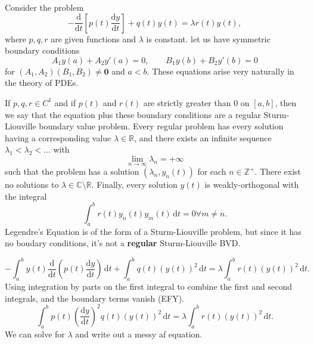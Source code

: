 Consider the problem
\[
	-\frac{\mathrm{d}}{\mathrm{d}t} \left[ p(t)\frac{\mathrm{d}y}{\mathrm{d}t}  \right] +q(t)y(t)=\lambda r(t)y(t)
,\]
where $p,q,r$ are given functions and $\lambda $ is constant. let us have symmetric boundary conditions
\[
	A_1y(a)+A_2y'(a)=0,\qquad B_1y(b)+B_2y'(b)=0
\]
for $(A_1,A_2)(B_1,B_2)\neq \mathbf{0} $ and $a<b$. These equations arise very naturally in the theory of PDEs.

If $p,q,r\in C^1$ and if $p(t)$ and $r(t)$ are strictly greater than $0$ on $[a,b]$, then we say that the equation plus these boundary conditions are a regular Sturm-Liouville boundary value problem. Every regular problem has every solution having a corresponding value $\lambda \in\mathbb{R}$, and there exists an infinite sequence $\lambda_1 <\lambda_2<\ldots$ with
\[
	\lim_{n \to \infty} \lambda_n=+\infty
\]
such that the problem has a solution  $\left( \lambda _n,y_n(t) \right) $ for each $n\in\mathbb{Z}^+$. There exist no solutions to $\lambda \in\mathbb{C}\setminus\mathbb{R}$. Finally, every solution $y(t)$ is weakly-orthogonal with the integral
\[
	\int_{a}^{b} r(t)y_n(t)y_m(t) \,\mathrm{d} t=0\forall m\neq n
.\]
Legendre's Equation is of the form of a Sturm-Liouville problem, but since it has no boudary conditions, it's not a \textbf{regular} Sturm-Liouville BVD.

\[
	-\int_{a}^{b} y(t)\frac{\mathrm{d}}{\mathrm{d}t} \left( p(t)\frac{\mathrm{d}y}{\mathrm{d}t}  \right)  \,\mathrm{d} t+\int_{a}^{b} q(t)\left( y(t) \right) ^2 \,\mathrm{d} t=\lambda \int_{a}^{b} r(t)(y(t))^2 \,\mathrm{d} t
.\]
Using integration by parts on the first integral to combine the first and second integrals, and the boundary terms vanish (EFY).
\[
	\int_{a}^{b} p(t)\left( \frac{\mathrm{d}y}{\mathrm{d}t}  \right) ^2q(t)\left( y(t) \right) ^2 \,\mathrm{d} t=\lambda \int_{a}^{b} r(t)\left( y(t) \right) ^2 \,\mathrm{d} t
.\]
We can solve for $\lambda $ and write out a messy af equation.

